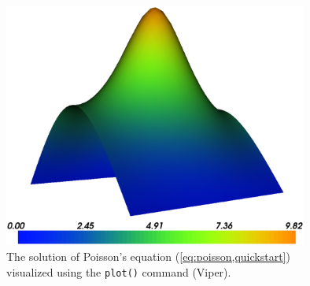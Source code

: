 \begin{figure}[htbp]
  \begin{center}
    \includegraphics[width=10cm]{eps/poisson.eps}
    \caption{The solution of Poisson's equation
      (\ref{eq:poisson,quickstart}) visualized using the \texttt{plot()}
      command (Viper).}
  \end{center}
\end{figure}
